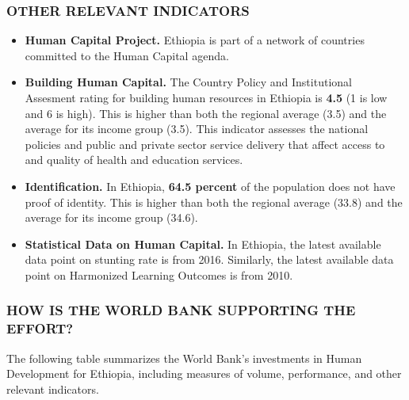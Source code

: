 \documentclass[9.2pt,twocolumn]{article}
\begin{document}
\hypertarget{section-3}{%
\subsubsection{\texorpdfstring{\textcolor{bondiblue}{\textbf{O\small{THER RELEVANT INDICATORS }}}}{}}\label{section-3}}

\begin{itemize}
\item
  \textbf{Human Capital Project.} Ethiopia is part of a network of
  countries committed to the Human Capital agenda.
\item
  \textbf{Building Human Capital.} The Country Policy and Institutional
  Assesment rating for building human resources in Ethiopia is
  \textbf{4.5} (1 is low and 6 is high). This is higher than both the
  regional average (3.5) and the average for its income group (3.5).
  This indicator assesses the national policies and public and private
  sector service delivery that affect access to and quality of health
  and education services.
\item
  \textbf{Identification.} In Ethiopia, \textbf{64.5 percent} of the
  population does not have proof of identity. This is higher than both
  the regional average (33.8) and the average for its income group
  (34.6).
\item
  \textbf{Statistical Data on Human Capital.} In Ethiopia, the latest
  available data point on stunting rate is from 2016. Similarly, the
  latest available data point on Harmonized Learning Outcomes is from
  2010.
\end{itemize}

\hypertarget{section-4}{%
\subsubsection{\texorpdfstring{\textcolor{bondiblue}{\textbf{H\small{OW IS THE WORLD BANK SUPPORTING THE EFFORT?}}}}{}}\label{section-4}}

The following table summarizes the World Bank's investments in Human
Development for Ethiopia, including measures of volume, performance, and
other relevant indicators.
\end{document}
